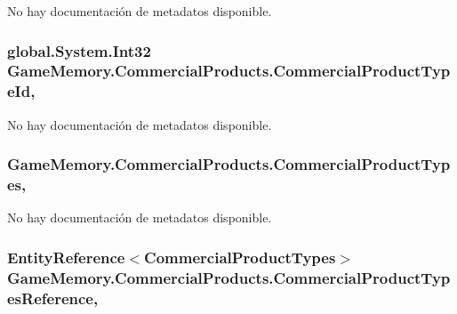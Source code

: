 No hay documentación de metadatos disponible. 

\hypertarget{class_game_memory_1_1_commercial_products_a0bc077baf7304a4621d25f0d64890148}{
\subsubsection[{Commercial\-Product\-Type\-Id}]{\setlength{\rightskip}{0pt plus 5cm}global.\-System.\-Int32 Game\-Memory.\-Commercial\-Products.\-Commercial\-Product\-Type\-Id\hspace{0.3cm}{\ttfamily [get]}, {\ttfamily [set]}}}\label{class_game_memory_1_1_commercial_products_a0bc077baf7304a4621d25f0d64890148}


No hay documentación de metadatos disponible. 

\hypertarget{class_game_memory_1_1_commercial_products_ac5813dda9f061765d3f1aacb9dda00bf}{
\subsubsection[{Commercial\-Product\-Types}]{ Game\-Memory.\-Commercial\-Products.\-Commercial\-Product\-Types\hspace{0.3cm}{\ttfamily [get]}, {\ttfamily [set]}}}\label{class_game_memory_1_1_commercial_products_ac5813dda9f061765d3f1aacb9dda00bf}


No hay documentación de metadatos disponible. 

\hypertarget{class_game_memory_1_1_commercial_products_a57288a4508f92f6aa62dc7402618e8f2}{
\subsubsection[{Commercial\-Product\-Types\-Reference}]{\setlength{\rightskip}{0pt plus 5cm}Entity\-Reference$<${\bf Commercial\-Product\-Types}$>$ Game\-Memory.\-Commercial\-Products.\-Commercial\-Product\-Types\-Reference\hspace{0.3cm}{\ttfamily [get]}, {\ttfamily [set]}}}\label{class_game_memory_1_1_commercial_products_a57288a4508f92f6aa62dc7402618e8f2}


